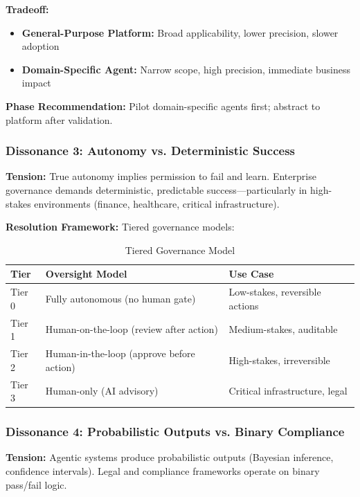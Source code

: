 \documentclass[11pt,a4paper]{article}
\begin{document}
\textbf{Tradeoff:}
\begin{itemize}
\item \textbf{General-Purpose Platform:} Broad applicability, lower precision, slower adoption
\item \textbf{Domain-Specific Agent:} Narrow scope, high precision, immediate business impact
\end{itemize}

\textbf{Phase Recommendation:} Pilot domain-specific agents first; abstract to platform after validation.

\subsubsection{Dissonance 3: Autonomy vs. Deterministic Success}

\textbf{Tension:} True autonomy implies permission to fail and learn. Enterprise governance demands deterministic, predictable success—particularly in high-stakes environments (finance, healthcare, critical infrastructure).

\textbf{Resolution Framework:} Tiered governance models:

\begin{table}[h]
\centering
\begin{tabular}{|l|l|l|}
\hline
\textbf{Tier} & \textbf{Oversight Model} & \textbf{Use Case} \\ \hline
Tier 0 & Fully autonomous (no human gate) & Low-stakes, reversible actions \\ \hline
Tier 1 & Human-on-the-loop (review after action) & Medium-stakes, auditable \\ \hline
Tier 2 & Human-in-the-loop (approve before action) & High-stakes, irreversible \\ \hline
Tier 3 & Human-only (AI advisory) & Critical infrastructure, legal \\ \hline
\end{tabular}
\caption{Tiered Governance Model}
\end{table}

\subsubsection{Dissonance 4: Probabilistic Outputs vs. Binary Compliance}

\textbf{Tension:} Agentic systems produce probabilistic outputs (Bayesian inference, confidence intervals). Legal and compliance frameworks operate on binary pass/fail logic.
\end{document}
